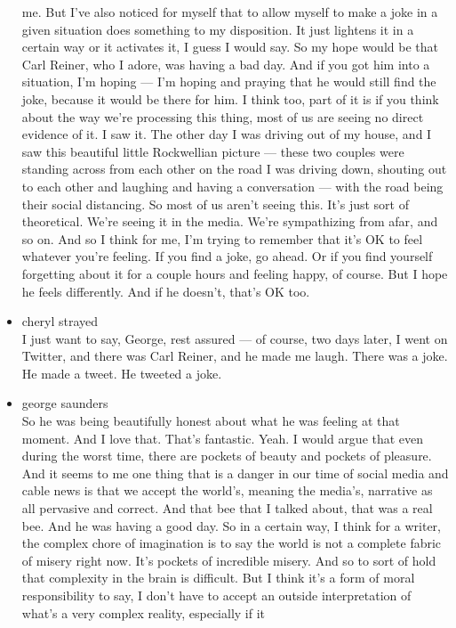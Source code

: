 \begin{itemize}
  me. But I've also noticed for myself that to allow myself to make a
  joke in a given situation does something to my disposition. It just
  lightens it in a certain way or it activates it, I guess I would say.
  So my hope would be that Carl Reiner, who I adore, was having a bad
  day. And if you got him into a situation, I'm hoping --- I'm hoping
  and praying that he would still find the joke, because it would be
  there for him. I think too, part of it is if you think about the way
  we're processing this thing, most of us are seeing no direct evidence
  of it. I saw it. The other day I was driving out of my house, and I
  saw this beautiful little Rockwellian picture --- these two couples
  were standing across from each other on the road I was driving down,
  shouting out to each other and laughing and having a conversation ---
  with the road being their social distancing. So most of us aren't
  seeing this. It's just sort of theoretical. We're seeing it in the
  media. We're sympathizing from afar, and so on. And so I think for me,
  I'm trying to remember that it's OK to feel whatever you're feeling.
  If you find a joke, go ahead. Or if you find yourself forgetting about
  it for a couple hours and feeling happy, of course. But I hope he
  feels differently. And if he doesn't, that's OK too.
\item
  cheryl strayed\\
  I just want to say, George, rest assured --- of course, two days
  later, I went on Twitter, and there was Carl Reiner, and he made me
  laugh. There was a joke. He made a tweet. He tweeted a joke.
\item
  george saunders\\
  So he was being beautifully honest about what he was feeling at that
  moment. And I love that. That's fantastic. Yeah. I would argue that
  even during the worst time, there are pockets of beauty and pockets of
  pleasure. And it seems to me one thing that is a danger in our time of
  social media and cable news is that we accept the world's, meaning the
  media's, narrative as all pervasive and correct. And that bee that I
  talked about, that was a real bee. And he was having a good day. So in
  a certain way, I think for a writer, the complex chore of imagination
  is to say the world is not a complete fabric of misery right now. It's
  pockets of incredible misery. And so to sort of hold that complexity
  in the brain is difficult. But I think it's a form of moral
  responsibility to say, I don't have to accept an outside
  interpretation of what's a very complex reality, especially if it

\end{itemize}
